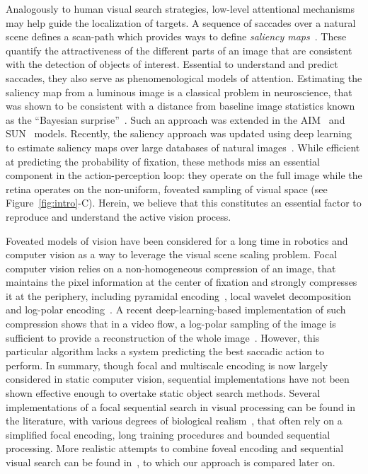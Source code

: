 Analogously to human visual search strategies, low-level attentional mechanisms may help guide the localization of targets. A sequence of saccades over a natural scene defines a scan-path which provides ways to define \emph{saliency maps}~\cite{Itti01}. These quantify the attractiveness of the different parts of an image that are consistent with the detection of objects of interest. Essential to understand and predict saccades, they also serve as phenomenological models of attention. Estimating the saliency map from a luminous image is a classical problem in neuroscience, that was shown to be consistent with a distance from baseline image statistics known as the ``Bayesian surprise''~\cite{Itti2009}. Such an approach was extended in the AIM~\cite{Bruce2009} and SUN~\cite{Zhang2008} models. Recently, the saliency approach was updated using deep learning to estimate saliency maps over large databases of natural images~\cite{Kummerer17}. While efficient at predicting the probability of fixation, these methods miss an essential component in the action-perception loop: they operate on the full image while the retina operates on the non-uniform, foveated sampling of visual space (see Figure~\ref{fig:intro}-C). Herein, we believe that this constitutes an essential factor to reproduce and understand the active vision process.

Foveated models of vision have been considered for a long time in robotics and computer vision as a way to leverage the visual scene scaling problem. Focal computer vision relies on a non-homogeneous compression of an image, that maintains the pixel information at the center of fixation and strongly compresses it at the periphery, including pyramidal encoding~\cite{kortum1996implementation,Butko2010infomax}, local wavelet decomposition~\cite{dauce2018active} and log-polar encoding~\cite{Traver10}. A recent deep-learning-based implementation of such compression shows that in a video flow, a log-polar sampling of the image is sufficient to provide a reconstruction of the whole image~\cite{Kaplanyan19}. However, this particular algorithm lacks a system predicting the best saccadic action to perform. In summary, though focal and multiscale encoding is now largely considered in static computer vision, sequential implementations have not been shown effective enough to overtake static object search methods. Several implementations of a focal sequential search in visual processing can be found in the literature, with various degrees of biological realism~\cite{mnih2014recurrent,fu2017look}, that often rely on a simplified focal encoding, long training procedures and bounded sequential processing. More realistic attempts to combine foveal encoding and sequential visual search can be found in~\cite{Butko2010infomax,denil2012learning}, to which our approach is compared later on.

